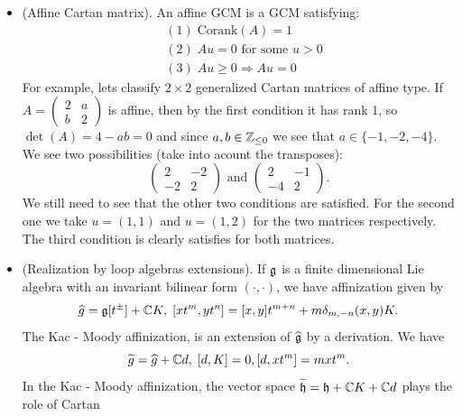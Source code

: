 \begin{itemize}
    \item(Affine Cartan matrix). An affine GCM is a GCM satisfying:
    \begin{equation}
        \begin{aligned}
           &(1)\;\text{Corank}(A) = 1\\
           &(2)\;Au = 0 \text{ for some } u>0\\
           &(3)\; Au\geq0\Rightarrow Au = 0
        \end{aligned}
    \end{equation}
    For example, lets classify $2\times 2$ generalized Cartan matrices of affine type. If 
    $A=(\begin{smallmatrix}2&a\\b&2\end{smallmatrix})$ is affine, then by the first condition it has rank 1, so 
    $\det(A)=4-ab=0$ and since $a,b\in\mathbb{Z}_{\leq0}$ we see that $a\in\{-1,-2,-4\}$. We see two possibilities (take into acount the transposes):
    \begin{equation}
        \begin{pmatrix}
            2&-2\\-2&2
        \end{pmatrix}\text{ and }
        \begin{pmatrix}
            2&-1\\-4&2
        \end{pmatrix}.
    \end{equation}    
    We still need to see that the other two conditions are satisfied. For the second one we take $u=(1,1)$ and $u=(1,2)$ for 
    the two matrices respectively. The third condition is clearly satisfies for both matrices.
    \item(Realization by loop algebras extensions). If $\mathfrak{g}$ is a finite dimensional Lie algebra with 
    an invariant bilinear form $(\cdot,\cdot)$, we have affinization given by 
    \begin{equation}
        \widehat{g} = \mathfrak{g}[t^\pm] +\mathbb{C} K,\;[xt^m,yt^n]=[x,y]t^{m+n} + m\delta_{m,-n}(x,y)K.
    \end{equation}
    The Kac - Moody affinization, is an extension of $\widehat{\mathfrak{g}}$ by a derivation. We have 
    \begin{equation}
        \widetilde{g} = \widehat{g} +\mathbb{C} d,\; [d, K] = 0,[d,xt^m] = mxt^m.
    \end{equation}
    In the Kac - Moody affinization, the vector space $\widetilde{\mathfrak{h}} = \mathfrak{h} +\mathbb{C} K + \mathbb{C} d$ plays the role of Cartan 

\end{itemize}
